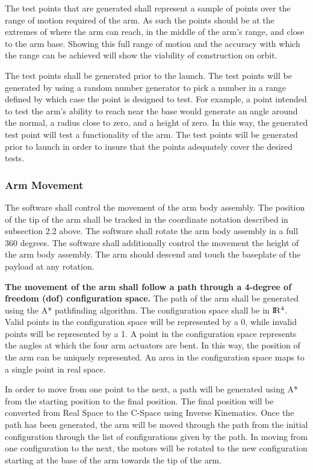 The test points that are generated shall represent a sample of points over the range of motion required 
of the arm. As such the points should be at the extremes of where the arm can reach, in the middle of 
the arm's range, and close to the arm base. Showing this full range of motion and the accuracy with 
which the range can be achieved will show the viability of construction on orbit.

The test points shall be generated prior to the launch. The test points will be generated by using a 
random number generator to pick a number in a range defined by which case the point is designed to test. 
For example, a point intended to test the arm's ability to reach near the base would generate an angle 
around the normal, a radius close to zero, and a height of zero. In this way, the generated test point 
will test a functionality of the arm. The test points will be generated prior to launch in order to 
insure that the points adequately cover the desired tests.

\subsubsection{Arm Movement}
The software shall control the movement of the arm body assembly. 
The position of the tip of the arm shall be tracked in the coordinate notation described in subsection 2.2 above.
The software shall rotate the arm body assembly in a full 360 degrees.
The software shall additionally control the movement the height of the arm body assembly.
The arm should descend and touch the baseplate of the payload at any rotation.

\textbf{The movement of the arm shall follow a path through a 4-degree of freedom (dof) configuration
space.} The path of the arm shall be generated using the A* pathfinding algorithm. The configuration 
		space shall be in \(\rm I\!R^4\). Valid points in the configuration space will be represented by a 0, 
while invalid points will be represented by a 1. A point in the configuration space represents the 
angles at which the four arm actuators are bent. In this way, the position of the arm can be uniquely
 represented. An area in the configuration space maps to a single point in real space.

In order to move from one point to the next, a path will be generated using A* from the starting position to the final position. The final position will be converted from Real Space to the C-Space using 
Inverse Kinematics. Once the path has been generated, the arm will be moved through the path from the 
initial configuration through the list of configurations given by the path. In moving from one 
configuration to the next, the motors will be rotated to the new configuration starting at the base of
the arm towards the tip of the arm.

